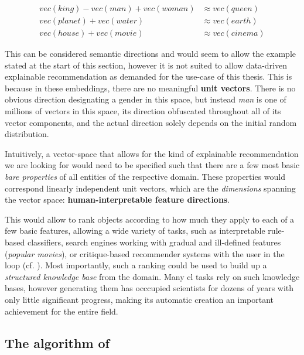 \begin{align}
	vec(king) - vec(man) + vec(woman) &\approx vec(queen) \nonumber \\ 
	vec(planet) + vec(water) &\approx vec(earth)  \label{eq:w2vregularity}\\
	vec(house) + vec(movie) &\approx vec(cinema) \nonumber
\end{align}

This can be considered semantic directions and would seem to allow the example stated at the start of this section, however it is not suited to allow data-driven explainable recommendation as demanded for the use-case of this thesis. This is because in these embeddings, there are no meaningful \textbf{unit vectors}. There is no obvious direction designating a gender in this space, but instead \textit{man} is one of millions of vectors in this space, its direction obfuscated throughout all of its vector components, and the actual direction solely depends on the initial random distribution. 

Intuitively, a vector-space that allows for the kind of explainable recommendation we are looking for would need to be specified such that there are a few most basic \textit{bare properties} of all entities of the respective domain. These properties would correspond linearly independent unit vectors, which are the \textit{dimensions} spanning the vector space: \textbf{human-interpretable feature directions}.

This would allow to rank objects according to how much they apply to each of a few basic features, allowing a wide variety of tasks, such as interpretable rule-based classifiers, search engines working with gradual and ill-defined features (\eg \textit{popular movies}), or critique-based recommender systems with the user in the loop (cf. \cite{Ager2018}). Most importantly, such a ranking could be used to build up a \textit{structured knowledge base} from the domain. Many \gls{cl} tasks rely on such knowledge bases, however generating them has occcupied scientists for dozens of years with only little significant progress, making its automatic creation an important achievement for the entire field.

\subsection{The algorithm of \textcite{Derrac2015}}

